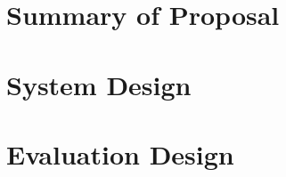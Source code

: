 \section{Summary of Proposal}          \label{desProSum}
\section{System Design}                \label{desSys}
\section{Evaluation Design}            \label{desEval}
